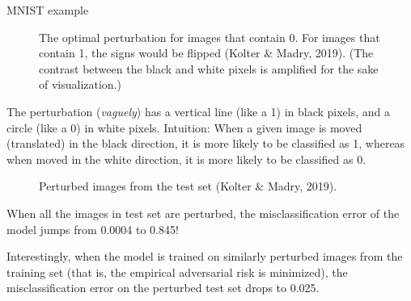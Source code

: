 \begin{vbframe} {MNIST example}
\begin{itemize}
\begin{figure}
      \caption{The optimal perturbation for images that contain 0. For images that contain 1, the signs would be flipped (Kolter \& Madry, 2019). (The contrast between the black and white pixels is amplified for the sake of visualization.) }
    \end{figure}
    \item The perturbation (\textit{vaguely}) has a vertical line (like a 1) in black pixels, and a circle (like a 0) in white pixels. Intuition: When a given image is moved (translated) in the black direction, it is more likely to be classified as 1, whereas when moved in the white direction, it is more likely to be classified as 0.
 
    \framebreak
    
    \begin{figure}
    \centering
    \captionsetup{font=footnotesize,labelfont=footnotesize, labelfont = bf}
      \caption{Perturbed images from the test set (Kolter \& Madry, 2019).}
    \end{figure}
    
      \item \small{When all the images in test set are perturbed, the misclassification error of the model jumps from 0.0004 to 0.845!
      \item Interestingly, when the model is trained on similarly perturbed images from the training set (that is, the empirical adversarial risk is minimized), the misclassification error on the perturbed test set drops to 0.025.}
    \end{itemize}
    \framebreak
  

\end{vbframe}
